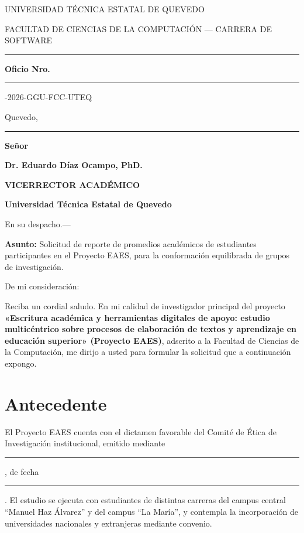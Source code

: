 \documentclass[11pt,a4paper]{article}
\newcommand{\campo}[1]{\rule{#1}{0.4pt}}
\begin{document}
\begin{center}
	{\sffamily\small\color{grismedio} UNIVERSIDAD T\'ECNICA ESTATAL DE QUEVEDO\par}
	{\sffamily\small\color{grismedio} FACULTAD DE CIENCIAS DE LA COMPUTACI\'ON --- CARRERA DE SOFTWARE\par}
\end{center}

\vspace{6pt}
\hrule
\vspace{10pt}

\begin{flushright}
	\textbf{Oficio Nro.} \campo{3.6cm}-2026-GGU-FCC-UTEQ

	Quevedo, \campo{4.6cm}
\end{flushright}

\vspace{6pt}
\textbf{Se\~nor}

\textbf{Dr. Eduardo D\'iaz Ocampo, PhD.}

\textbf{VICERRECTOR ACAD\'EMICO}

\textbf{Universidad T\'ecnica Estatal de Quevedo}

En su despacho.---

\vspace{8pt}
\textbf{Asunto:} Solicitud de reporte de promedios acad\'emicos de estudiantes participantes en el Proyecto EAES, para la conformaci\'on equilibrada de grupos de investigaci\'on.

\vspace{8pt}
De mi consideraci\'on:

Reciba un cordial saludo. En mi calidad de investigador principal del proyecto \textbf{«Escritura acad\'emica y herramientas digitales de apoyo: estudio multic\'entrico sobre procesos de elaboraci\'on de textos y aprendizaje en educaci\'on superior» (Proyecto EAES)}, adscrito a la Facultad de Ciencias de la Computaci\'on, me dirijo a usted para formular la solicitud que a continuaci\'on expongo.

\section{Antecedente}

El Proyecto EAES cuenta con el dictamen favorable del Comit\'e de \'Etica de Investigaci\'on institucional, emitido mediante \campo{5.0cm}, de fecha \campo{3.0cm}. El estudio se ejecuta con estudiantes de distintas carreras del campus central ``Manuel Haz \'Alvarez'' y del campus ``La Mar\'ia'', y contempla la incorporaci\'on de universidades nacionales y extranjeras mediante convenio.
\end{document}
